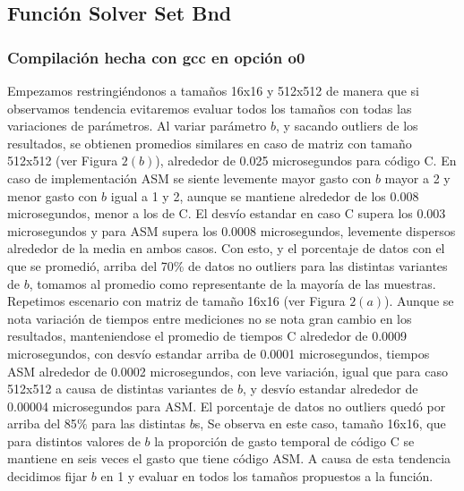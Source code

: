  

 
\subsection{Función Solver Set Bnd }
 \subsubsection{Compilación hecha con gcc en opción o0} 
Empezamos restringiéndonos a tamaños 16x16 y 512x512 de manera que si observamos tendencia evitaremos evaluar todos los tamaños con todas las variaciones de parámetros. Al variar parámetro $b$, y sacando outliers de los resultados, se obtienen promedios similares en caso de matriz con tamaño 512x512 (ver Figura $2(b)$), alrededor de 0.025 microsegundos para código C. En caso de implementación ASM se siente levemente mayor gasto con $b$ mayor a 2 y menor gasto con $b$ igual a 1 y 2, aunque se mantiene alrededor de los 0.008 microsegundos, menor a los de C. El desvío estandar en caso C supera los 0.003 microsegundos y para ASM supera los 0.0008 microsegundos, levemente dispersos alrededor de la media en ambos casos. Con esto, y el porcentaje de datos con el que se promedió, arriba del 70$\%$ de datos no outliers para las distintas variantes de $b$, tomamos al promedio como representante de la mayoría de las muestras.\\
Repetimos escenario con matriz de tamaño 16x16 (ver Figura $2(a)$). Aunque se nota variación de tiempos entre mediciones no se nota gran cambio en los resultados, manteniendose el promedio de tiempos C alrededor de 0.0009 microsegundos, con desvío estandar arriba de 0.0001 microsegundos, tiempos ASM alrededor de 0.0002 microsegundos, con leve variación, igual que para caso 512x512 a causa de distintas variantes de $b$, y desvío estandar alrededor de 0.00004 microsegundos para ASM. El porcentaje de datos no outliers quedó por arriba del 85$\%$ para las distintas $b$s,
Se observa en este caso, tamaño 16x16, que para distintos valores de $b$ la proporción de gasto temporal de código C se mantiene en 
seis veces el gasto que tiene código ASM. A causa de esta tendencia decidimos fijar $b$ en 1 y evaluar en todos los tamaños propuestos a la función. 
\newline

